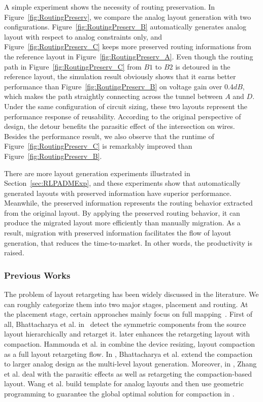       A simple experiment shows the necessity of routing preservation. In Figure~\ref{fig:RoutingPreserv}, we compare the analog layout generation with two configurations. Figure~\ref{fig:RoutingPreserv_B} automatically generates analog layout with respect to analog constraints only, and Figure~\ref{fig:RoutingPreserv_C} keeps more preserved routing informations from the reference layout in Figure~\ref{fig:RoutingPreserv_A}. Even though the routing path in Figure~\ref{fig:RoutingPreserv_C} from $B1$ to $B2$ is detoured in the reference layout, the simulation result obviously shows that it earns better performance than Figure~\ref{fig:RoutingPreserv_B} on voltage gain over 0.4$dB$, which makes the path straightly connecting across the tunnel between $A$ and $D$. Under the same configuration of circuit sizing, these two layouts represent the performance response of reusability. According to the original perspective of design, the detour benefits the parasitic effect of the intersection on wires. Besides the performance result, we also observe that the runtime of Figure~\ref{fig:RoutingPreserv_C} is remarkably improved than Figure~\ref{fig:RoutingPreserv_B}. 
      
      There are more layout generation experiments illustrated in Section~\ref{sec:RLPADMExp}, and these experiments show that automatically generated layouts with preserved information have superior performance. Meanwhile, the preserved information represents the routing behavior extracted from the original layout. By applying the preserved routing behavior, it can produce the migrated layout more efficiently than manually migration. As a result, migration with preserved information facilitates the flow of layout generation, that reduces the time-to-market. In other words, the productivity is raised.

      \subsubsection{Previous Works}

      The problem of layout retargeting has been widely discussed in the literature. We can roughly categorize them into two major stages, placement and routing. At the placement stage, certain approaches mainly focus on full mapping~\cite{Bhattacharya_ASPDAC04,cbc-bhattacharya-dac04,msc-bhattacharya-tcad06,Zhang_TCAD08,LayoutRetarg_Liu_ASPDAC2010,Wang_ALRGP_TODAES2011}. First of all, Bhattacharya et al. in~\cite{Bhattacharya_ASPDAC04} detect the symmetric components from the source layout hierarchically and retarget it. \cite{cbc-bhattacharya-dac04} later enhances the retargeting layout with compaction. Hammouda et al. in\cite{cart-hammouda-dac06} combine the device resizing, layout compaction as a full layout retargeting flow. In \cite{msc-bhattacharya-tcad06}, Bhattacharya et al. extend the compaction to larger analog design as the multi-level layout generation. Moreover, in \cite{Zhang_TCAD08}, Zhang et al. deal with the parasitic effects as well as retargeting the compaction-based layout. Wang et al. build template for analog layouts and then use geometric programming to guarantee the global optimal solution for compaction in \cite{Wang_ALRGP_TODAES2011}. 


